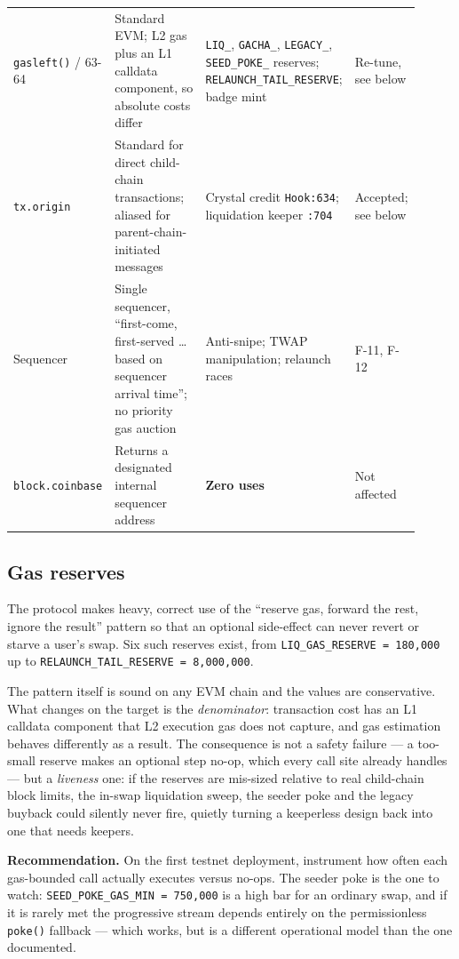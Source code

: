 \documentclass[11pt,a4paper]{article}
\newcommand{\code}[1]{\texttt{\small #1}}
\newcommand{\fileref}[1]{\texttt{\scriptsize #1}}
\begin{document}
\begin{longtable}{@{}p{0.15\linewidth}p{0.33\linewidth}p{0.30\linewidth}p{0.13\linewidth}@{}}
\code{gasleft()} / 63-64 &
Standard EVM; L2 gas plus an L1 calldata component, so absolute costs differ &
\code{LIQ\_}, \code{GACHA\_}, \code{LEGACY\_}, \code{SEED\_POKE\_} reserves; \code{RELAUNCH\_TAIL\_RESERVE}; badge mint &
\textcolor{medium}{Re-tune, see below} \\

\code{tx.origin} &
Standard for direct child-chain transactions; aliased for parent-chain-initiated messages &
Crystal credit \fileref{Hook:634}; liquidation keeper \fileref{:704} &
\textcolor{low}{Accepted; see below} \\

Sequencer &
Single sequencer, ``first-come, first-served \dots based on sequencer arrival time''; no priority gas auction &
Anti-snipe; TWAP manipulation; relaunch races &
\textcolor{medium}{F-11, F-12} \\

\code{block.\allowbreak coinbase} &
Returns a designated internal sequencer address &
\textbf{Zero uses} &
\textcolor{good}{Not affected} \\
\bottomrule
\end{longtable}

\subsection{Gas reserves}

The protocol makes heavy, correct use of the ``reserve gas, forward the rest,
ignore the result'' pattern so that an optional side-effect can never revert or
starve a user's swap. Six such reserves exist, from
\code{LIQ\_GAS\_RESERVE = 180{,}000} up to
\code{RELAUNCH\_TAIL\_RESERVE = 8{,}000{,}000}.

The pattern itself is sound on any EVM chain and the values are conservative. What
changes on the target is the \emph{denominator}: transaction cost has an L1
calldata component that L2 execution gas does not capture, and gas estimation
behaves differently as a result. The consequence is not a safety failure --- a
too-small reserve makes an optional step no-op, which every call site already
handles --- but a \emph{liveness} one: if the reserves are mis-sized relative to
real child-chain block limits, the in-swap liquidation sweep, the seeder poke and
the legacy buyback could silently never fire, quietly turning a keeperless design
back into one that needs keepers.

\textbf{Recommendation.} On the first testnet deployment, instrument how often each
gas-bounded call actually executes versus no-ops. The seeder poke is the one to
watch: \code{SEED\_POKE\_GAS\_MIN = 750{,}000} is a high bar for an ordinary swap,
and if it is rarely met the progressive stream depends entirely on the
permissionless \code{poke()} fallback --- which works, but is a different
operational model than the one documented.
\end{document}
